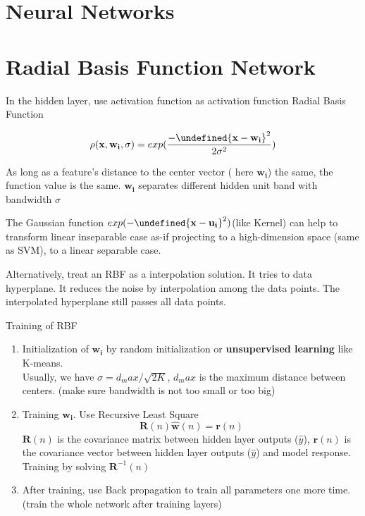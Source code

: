\documentclass[11pt, openany]{book}              %
\let\norm\undefined %
\DeclarePairedDelimiter\norm{\lVert}{\rVert}
\begin{document}
\section{Neural Networks}

\section{Radial Basis Function Network}

In the hidden layer, use activation function as activation function 
Radial Basis Function

$$ \rho(\mathbf{x,w_i},\sigma) = exp(\frac{ -{\norm{ \mathbf{x} - \mathbf{w_i} }}^2}{2\sigma^2})$$

As long as a feature's distance to the center vector ( here $\mathbf{w_i}$) the same, the function value is the same. $\mathbf{w_i}$ separates different hidden unit band with bandwidth $\sigma$ 

The Gaussian function $exp(-\norm{\mathbf{x} - \mathbf{u_i}}^2)$(like Kernel) can help to transform linear inseparable case as-if projecting to a high-dimension space (same as SVM), to a linear separable case.

Alternatively, treat an RBF as a interpolation solution. It tries to data hyperplane. It reduces the noise by interpolation among the data points. The interpolated hyperplane still passes all data points. 

Training of RBF

\begin{enumerate}
	\item Initialization of $\mathbf{w_i}$ by random initialization or \textbf{unsupervised learning} like K-means. \\ Usually, we have $\sigma = d_max/\sqrt{2K}$, $d_max$ is the maximum distance between centers. (make sure bandwidth is not too small or too big)
	\item Training $\mathbf{w_i}$. Use Recursive Least Square 
	$$\mathbf{R}(n)\mathbf{\hat{w}}(n) = \mathbf{r}(n)$$
	$\mathbf{R}(n)$ is the covariance matrix between hidden layer outputs ($\hat{y}$), $\mathbf{r}(n)$ is the covariance vector between hidden layer outputs ($\hat{y}$) and model response. \\
		Training by solving $\mathbf{R}^{-1}(n)$
	\item After training, use Back propagation to train all parameters one more time. (train the whole network after training layers)
\end{enumerate}
\end{document}
